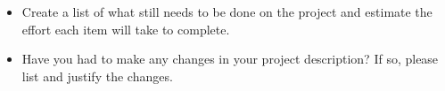 \begin{itemize}
	\item Create a list of what still needs to be done on the project and estimate the effort each item will take to complete.
	\item Have you had to make any changes in your project description? If so, please list and justify the changes.
\end{itemize}